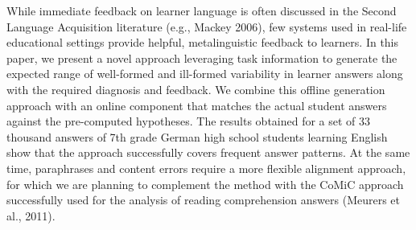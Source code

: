 While immediate feedback on learner language is often discussed in the Second Language Acquisition literature (e.g., Mackey 2006), few systems used in real-life educational settings provide helpful, metalinguistic feedback to learners. In this paper, we present a novel approach leveraging task information to generate the expected range of well-formed and ill-formed variability in learner answers along with the required diagnosis and feedback. We combine this offline generation approach with an online component that matches the actual student answers against the pre-computed hypotheses. The results obtained for a set of 33 thousand answers of 7th grade German high school students learning English show that the approach successfully covers frequent answer patterns. At the same time, paraphrases and content errors require a more flexible alignment approach, for which we are planning to complement the method with the CoMiC approach successfully used for the analysis of reading comprehension answers (Meurers et al., 2011).
